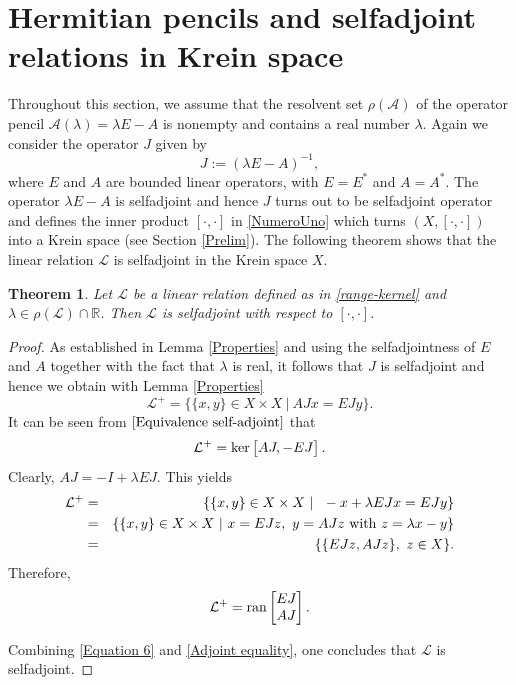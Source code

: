 \documentclass{birkjour}
\newtheorem{thm}{Theorem}[section]
\theoremstyle{definition}
\theoremstyle{remark}
\numberwithin{equation}{section}
\newcommand{\A}{\mathcal A}
\begin{document}
\section{Hermitian pencils and selfadjoint relations in Krein space}
Throughout this section, we assume that the resolvent set $\rho(\A)$ of the operator pencil $\A(\lambda)=\lambda E-A$ is nonempty and contains a real number $\lambda$. Again we consider the operator $J$ given by 
\begin{equation}\label{Tashkent}
J:= (\lambda E-A)^{-1},
\end{equation}
where $E$ and $A$ are bounded linear operators, with $E=E^{*}$ and $A=A^{*}$. The operator $\lambda E-A$
is selfadjoint and hence 
$J$ turns out to be selfadjoint operator
and defines the inner product $[\cdot,\cdot]$ in \eqref{NumeroUno} which turns $(X, [\cdot,\cdot])$
into a Krein space (see Section \ref{Prelim}).
 The following theorem shows that the linear relation $\mathcal{L}$ is selfadjoint in the Krein space $X$. 
 
\begin{thm} \label{Self-adjoint linear relation}
     Let $\mathcal{L}$  be a linear relation defined as in \eqref{range-kernel} and $\lambda \in \rho(\mathcal{L}) \cap\mathbb{R}$. Then  $\mathcal{L}$ is selfadjoint with respect to $[\cdot, \cdot]$.
\end{thm}
\begin{proof} As established in Lemma \ref{Properties} and using the selfadjointness of $E$ and $A$ together with the fact that $\lambda$ is real, it follows that $J$ is selfadjoint and hence we obtain with Lemma \ref{Properties}
\begin{equation} \label{Equivalence self-adjoint} 
\mathcal{L}^{+} = \{\{x,y\}\in X \times X~|~ AJx=EJy \}.
\end{equation}  It can be seen from $\eqref{Equivalence self-adjoint}$ that $$\mathcal{L}^{+}= \textup{ker} 
\begin{bmatrix}
			AJ, -EJ
			\end{bmatrix}.$$
 Clearly, $AJ=-I+\lambda EJ$. This yields
\begin{eqnarray*}
  \mathcal{L}^{+} &=&   
    \{\{x,y\}\in X \times X~|~ \ -x + \lambda EJx =EJy \}\\ &=&
     \{\{x,y\}\in X \times X~|~  x=EJz,\ y=AJz\ \hbox{with}\ z=\lambda x-y\} \\&=&
     \{\{EJz,AJz\}, \ z\in X\}.  
\end{eqnarray*}
Therefore, \begin{equation}\label{Adjoint equality}
    \mathcal{L}^{+}=\textup{ran}\begin{bmatrix}
			EJ\\ AJ
			\end{bmatrix}. \end{equation}
 
\noindent Combining \eqref{Equation 6} and \eqref{Adjoint equality}, one concludes that $\mathcal{L}$ is selfadjoint.\end{proof}
\end{document}
